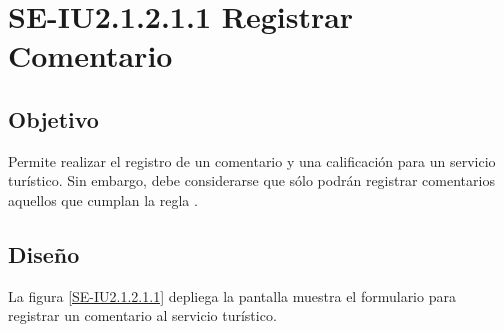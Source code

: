 \newpage
\section{SE-IU2.1.2.1.1 Registrar Comentario}

\subsection{Objetivo}
Permite realizar el registro de un comentario y una calificación para un servicio turístico. Sin embargo, debe considerarse que sólo podrán registrar comentarios aquellos que cumplan la regla .

\subsection{Diseño}
La figura \ref{SE-IU2.1.2.1.1} depliega la pantalla  muestra el formulario para registrar un comentario al servicio turístico.

